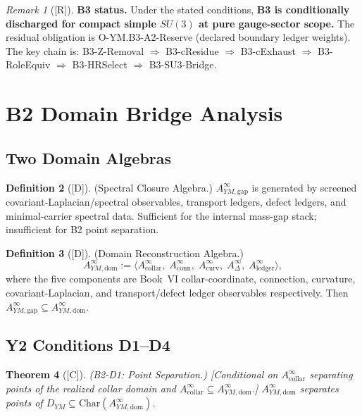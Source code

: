 \documentclass[12pt,oneside]{amsbook}
\theoremstyle{plain}
\newtheorem{theorem}{Theorem}[section]
\theoremstyle{definition}
\newtheorem{definition}[theorem]{Definition}
\theoremstyle{remark}
\newtheorem{remark}[theorem]{Remark}
\newcommand{\status}[1]{\textup{[#1]}}
\begin{document}
\begin{remark}[\status{R}]\label{rem:B3-status}
\textbf{B3 status.}
Under the stated conditions, \textbf{B3 is conditionally discharged for
compact simple $SU(3)$ at pure gauge-sector scope.} The residual
obligation is O-YM.B3-A2-Reserve (declared boundary ledger weights).
The key chain is: B3-Z-Removal $\Rightarrow$ B3-cResidue
$\Rightarrow$ B3-cExhaust $\Rightarrow$ B3-RoleEquiv
$\Rightarrow$ B3-HRSelect $\Rightarrow$ B3-SU3-Bridge.
\end{remark}

\section{B2 Domain Bridge Analysis}
\label{sec:B2-domain}

\subsection{Two Domain Algebras}

\begin{definition}[\status{D}]\label{def:YM-alg-gap}
\textup{(Spectral Closure Algebra.)}
$A_{YM,\mathrm{gap}}^{\infty}$ is generated by screened
covariant-Laplacian/spectral observables, transport ledgers, defect
ledgers, and minimal-carrier spectral data. Sufficient for the
internal mass-gap stack; insufficient for B2 point separation.
\end{definition}

\begin{definition}[\status{D}]\label{def:YM-alg-dom}
\textup{(Domain Reconstruction Algebra.)}
\[
 A_{YM,\mathrm{dom}}^{\infty} :=
 \langle A_{\mathrm{collar}}^{\infty},\;
 A_{\mathrm{conn}}^{\infty},\;
 A_{\mathrm{curv}}^{\infty},\;
 A_{\Delta}^{\infty},\;
 A_{\mathrm{ledger}}^{\infty} \rangle,
\]
where the five components are Book~VI collar-coordinate, connection,
curvature, covariant-Laplacian, and transport/defect ledger observables
respectively. Then $A_{YM,\mathrm{gap}}^{\infty} \subseteq
A_{YM,\mathrm{dom}}^{\infty}$.
\end{definition}

\subsection{Y2 Conditions D1--D4}

\begin{theorem}[\status{C}]\label{thm:B2-D1}
\textup{(B2-D1: Point Separation.)}
\textup{[Conditional on $A_{\mathrm{collar}}^{\infty}$ separating points
of the realized collar domain and
$A_{\mathrm{collar}}^{\infty}\subseteq A_{YM,\mathrm{dom}}^{\infty}$.]}
$A_{YM,\mathrm{dom}}^{\infty}$ separates points of $D_{YM} \subseteq
\mathrm{Char}(A_{YM,\mathrm{dom}}^{\infty})$.
\end{theorem}
\end{document}

